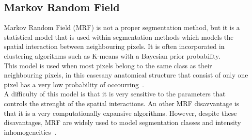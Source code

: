 \documentclass{standalone}
\begin{document}
	
	\subsection{Markov Random Field}
	
		Markov Random Field (MRF) is not a proper segmentation method, but it is a statistical model that is used within segmentation methods which models the spatial interaction between neighbouring pixels. It is often incorporated in clustering algorithms such as K-means with a Bayesian prior probability.\\
		This model is used when most pixels belong to the same class as their neighbouring pixels, in this casesany anatomical structure that consist of only one pixel has a very low probability of occourring~\cite{ART:Pham}.\\
		A difficulty of this model is that it is very sensitive to the parameters that controls the strenght of the spatial interactions. An other MRF disavvantage is that it is a very computationally expansive algorithms. However, despite these disavantages, MRF are widely used to model segmentation classes and intensity inhomogeneities~\cite{ART:Pham}. 
		 
\end{document}
